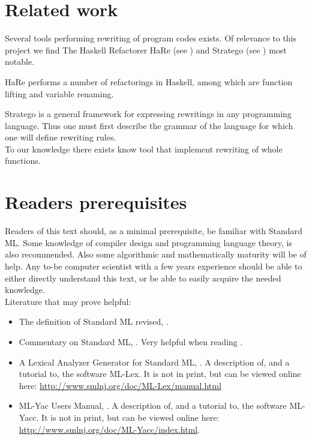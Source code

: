 
\section{Related work}
Several tools performing rewriting of program codes exists. Of relevance to this
project we find The Haskell Refactorer HaRe (see \cite{HARE}) and Stratego (see
\cite{stratego}) most notable.

HaRe performs a number of refactorings in Haskell, among which are function
lifting and variable renaming.

Stratego is a general framework for expressing rewritings in any programming
language. Thus one must first describe the grammar of the language for which one
will define rewriting rules.\\

To our knowledge there exists know tool that implement rewriting of whole
functions.

\section{Readers prerequisites}
Readers of this text should, as a minimal prerequisite, be familiar with
Standard ML. Some knowledge of compiler design and programming language theory,
is also recommended. Also some algorithmic and mathematically maturity will be
of help. Any to-be computer scientist with a few years experience should be able
to either directly understand this text, or be able to easily acquire the needed
knowledge.\\

\noindent
Literature that may prove helpful:

\begin{itemize}
\item The definition of Standard ML revised, \cite{SML97}.
\item Commentary on Standard ML, \cite{SMLCOMM}. Very helpful when reading
  \cite{SML97}.
\item A Lexical Analyzer Generator for Standard ML, \cite{MLLEX}. A description
  of, and a tutorial to, the software ML-Lex. It is not in print, but can be
  viewed online here: \url{http://www.smlnj.org/doc/ML-Lex/manual.html}
\item ML-Yac Users Manual, \cite{MLYACC}. A description of, and a tutorial to,
  the software ML-Yacc. It is not in print, but can be viewed online here:\\
  \mbox{\url{http://www.smlnj.org/doc/ML-Yacc/index.html}}.
\end{itemize}

